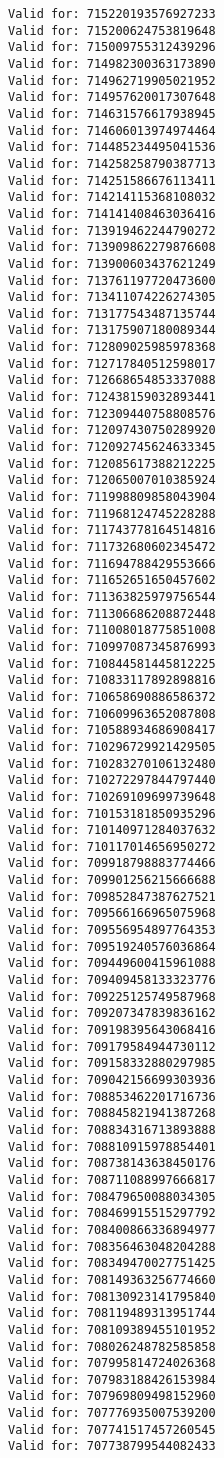 \documentclass[11pt]{article}
\begin{document}
\begin{Verbatim}[commandchars=\\\{\}]
Valid for: 715220193576927233
Valid for: 715200624753819648
Valid for: 715009755312439296
Valid for: 714982300363173890
Valid for: 714962719905021952
Valid for: 714957620017307648
Valid for: 714631576617938945
Valid for: 714606013974974464
Valid for: 714485234495041536
Valid for: 714258258790387713
Valid for: 714251586676113411
Valid for: 714214115368108032
Valid for: 714141408463036416
Valid for: 713919462244790272
Valid for: 713909862279876608
Valid for: 713900603437621249
Valid for: 713761197720473600
Valid for: 713411074226274305
Valid for: 713177543487135744
Valid for: 713175907180089344
Valid for: 712809025985978368
Valid for: 712717840512598017
Valid for: 712668654853337088
Valid for: 712438159032893441
Valid for: 712309440758808576
Valid for: 712097430750289920
Valid for: 712092745624633345
Valid for: 712085617388212225
Valid for: 712065007010385924
Valid for: 711998809858043904
Valid for: 711968124745228288
Valid for: 711743778164514816
Valid for: 711732680602345472
Valid for: 711694788429553666
Valid for: 711652651650457602
Valid for: 711363825979756544
Valid for: 711306686208872448
Valid for: 711008018775851008
Valid for: 710997087345876993
Valid for: 710844581445812225
Valid for: 710833117892898816
Valid for: 710658690886586372
Valid for: 710609963652087808
Valid for: 710588934686908417
Valid for: 710296729921429505
Valid for: 710283270106132480
Valid for: 710272297844797440
Valid for: 710269109699739648
Valid for: 710153181850935296
Valid for: 710140971284037632
Valid for: 710117014656950272
Valid for: 709918798883774466
Valid for: 709901256215666688
Valid for: 709852847387627521
Valid for: 709566166965075968
Valid for: 709556954897764353
Valid for: 709519240576036864
Valid for: 709449600415961088
Valid for: 709409458133323776
Valid for: 709225125749587968
Valid for: 709207347839836162
Valid for: 709198395643068416
Valid for: 709179584944730112
Valid for: 709158332880297985
Valid for: 709042156699303936
Valid for: 708853462201716736
Valid for: 708845821941387268
Valid for: 708834316713893888
Valid for: 708810915978854401
Valid for: 708738143638450176
Valid for: 708711088997666817
Valid for: 708479650088034305
Valid for: 708469915515297792
Valid for: 708400866336894977
Valid for: 708356463048204288
Valid for: 708349470027751425
Valid for: 708149363256774660
Valid for: 708130923141795840
Valid for: 708119489313951744
Valid for: 708109389455101952
Valid for: 708026248782585858
Valid for: 707995814724026368
Valid for: 707983188426153984
Valid for: 707969809498152960
Valid for: 707776935007539200
Valid for: 707741517457260545
Valid for: 707738799544082433

\end{Verbatim}
\end{document}
